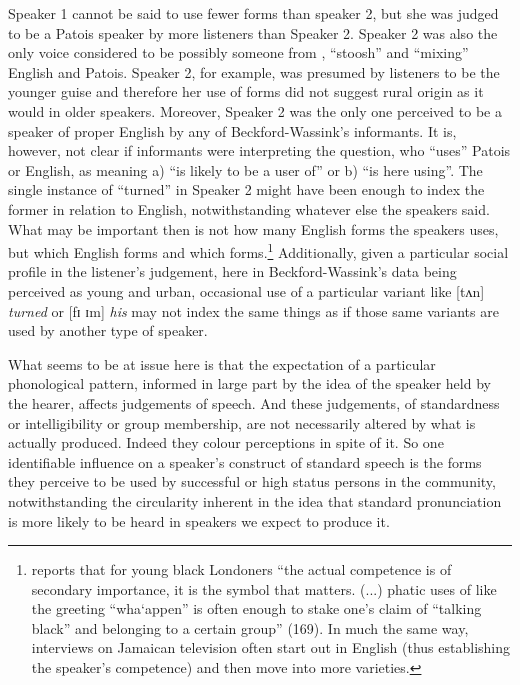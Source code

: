 Speaker 1 cannot be said to use fewer  forms than speaker 2, but she was judged to be a Patois speaker by more listeners than Speaker 2.  Speaker 2 was also the only voice considered to be possibly someone from , “stoosh” and “mixing” English and Patois.  Speaker 2, for example, was presumed by listeners to be the younger guise and therefore her use of  forms did not suggest rural origin as it would in older speakers.  Moreover, Speaker 2 was the only one perceived to be a speaker of proper English by any of Beckford-Wassink’s informants.  It is, however, not clear if informants were interpreting the question, who “uses” Patois or English, as meaning a) “is likely to be a user of” or b) “is here using”.  The single instance of “turned” in Speaker 2 might have been enough to index the former in relation to English, notwithstanding whatever else the speakers said.  What may be important then is not how many English forms the speakers uses, but which English forms and which  forms.\footnote{\citet{Muhleisen2002} reports that for young black Londoners “the actual competence is of secondary importance, it is the symbol that matters. (...) phatic uses of  like the greeting “wha‘appen” is often enough to stake one’s claim of “talking black” and belonging to a certain group” (169).  In much the same way, interviews on Jamaican television often start out in English (thus establishing the speaker’s competence) and then move into more  varieties.}  Additionally, given a particular social profile in the listener’s judgement, here in Beckford-Wassink’s data being perceived as young and urban, occasional use of a particular variant like [tʌn] \textit{turned} or [fɪ ɪm] \textit{his} may not index the same things as if those same variants are used by another type of speaker.  

What seems to be at issue here is that the expectation of a particular phonological pattern, informed in large part by the idea of the speaker held by the hearer, affects judgements of speech.  And these judgements, of standardness or intelligibility or group membership, are not necessarily altered by what is actually produced.  Indeed they colour perceptions in spite of it.  So one identifiable influence on a speaker’s construct of standard speech is the forms they perceive to be used by successful or high status persons in the community, notwithstanding the circularity inherent in the idea that standard pronunciation is more likely to be heard in speakers we expect to produce it.

